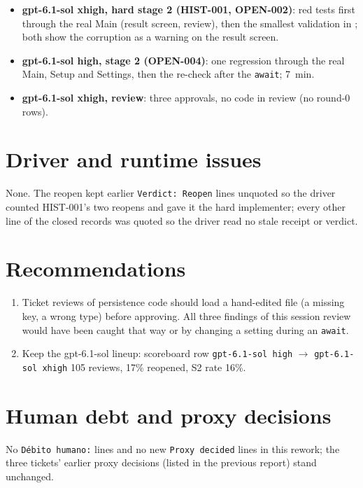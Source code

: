 \documentclass[11pt,a4paper]{article}
\begin{document}
\begin{itemize}
  \item \textbf{gpt-6.1-sol xhigh, hard stage 2 (HIST-001, OPEN-002)}: red tests first through
        the real Main (result screen, review), then the smallest validation in
        ; both show the corruption as a warning on the result screen.
  \item \textbf{gpt-6.1-sol high, stage 2 (OPEN-004)}: one regression through the real Main,
        Setup and Settings, then the re-check after the \texttt{await}; 7~min.
  \item \textbf{gpt-6.1-sol xhigh, review}: three approvals, no code in review (no round-0
        rows).
\end{itemize}

\section*{Driver and runtime issues}

None. The reopen kept earlier \texttt{Verdict: Reopen} lines unquoted so the driver counted
HIST-001's two reopens and gave it the hard implementer; every other line of the closed
records was quoted so the driver read no stale receipt or verdict.

\section*{Recommendations}

\begin{enumerate}
  \item Ticket reviews of persistence code should load a hand-edited file (a missing key, a
        wrong type) before approving. All three findings of this session review would have
        been caught that way or by changing a setting during an \texttt{await}.
  \item Keep the gpt-6.1-sol lineup: scoreboard row \texttt{gpt-6.1-sol high} $\rightarrow$
        \texttt{gpt-6.1-sol xhigh} 105 reviews, 17\% reopened, S2 rate 16\%.
\end{enumerate}

\section*{Human debt and proxy decisions}

No \texttt{Débito humano:} lines and no new \texttt{Proxy decided} lines in this rework; the
three tickets' earlier proxy decisions (listed in the previous report) stand unchanged.
\end{document}
